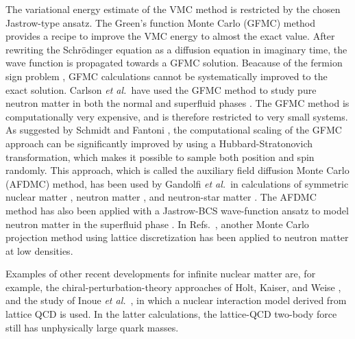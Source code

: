 \documentclass[a4paper,12pt]{report}
\begin{document}
The variational energy estimate of the VMC method is 
restricted by the chosen Jastrow-type ansatz. The Green's 
function Monte Carlo (GFMC) method \cite{pieper1998} provides 
a recipe to improve the VMC energy to almost the exact value. 
After rewriting the Schr{\"o}dinger equation as a diffusion 
equation in imaginary time, the wave function is propagated 
towards a GFMC solution. Beacause of the fermion sign problem 
\cite{pudliner1997}, GFMC calculations cannot be systematically
improved to the exact solution. Carlson \emph{et al.}~have 
used the GFMC method to study pure neutron matter in both the 
normal \cite{carlson_2003} and superfluid phases 
\cite{gezerlis2010}. The GFMC method is computationally very 
expensive, and is therefore restricted to very small systems.
As suggested by Schmidt and Fantoni \cite{schmidt_1999},
the computational scaling of the GFMC approach can be
significantly improved by using a Hubbard-Stratonovich 
transformation, which makes it possible to sample both 
position and spin randomly. This approach, which is called
the auxiliary field diffusion Monte Carlo (AFDMC) method,
has been used by Gandolfi \emph{et al.}~in calculations
of symmetric nuclear matter \cite{gandolfi2007}, 
neutron matter \cite{gandolfi_2009}, and neutron-star 
matter \cite{gandolfi_2010}. The AFDMC method has
also been applied with a Jastrow-BCS wave-function ansatz
to model neutron matter in the superfluid phase 
\cite{gandolfi_2012b}. In Refs.~\cite{borasoy2008,
epelbaum2009}, another Monte Carlo projection method 
using lattice discretization has been applied to neutron
matter at low densities.   
 
Examples of other recent developments for infinite nuclear
matter are, for example, the chiral-perturbation-theory
approaches of Holt, Kaiser, and Weise \cite{holt2013}, and
the study of Inoue \emph{et al.}~\cite{inoue2013}, in which
a nuclear interaction model derived from lattice QCD is used.
In the latter calculations, the lattice-QCD two-body force 
still has unphysically large quark masses. 



\vspace{2cm}
\end{document}

